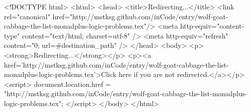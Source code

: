 <!DOCTYPE html>
<html>
<head>
<title>Redirecting...</title>
<link rel="canonical" href="http://mstksg.github.com/inCode/entry/wolf-goat-cabbage-the-list-monadplus-logic-problems.tex"/>
<meta http-equiv="content-type" content="text/html; charset=utf-8" />
<meta http-equiv="refresh" content="0; url=#{destination_path}" />
</head>
<body>
  <p><strong>Redirecting...</strong></p>
  <p><a href='http://mstksg.github.com/inCode/entry/wolf-goat-cabbage-the-list-monadplus-logic-problems.tex'>Click here if you are not redirected.</a></p>
  <script>
    document.location.href = "http://mstksg.github.com/inCode/entry/wolf-goat-cabbage-the-list-monadplus-logic-problems.tex";
  </script>
</body>
</html>
